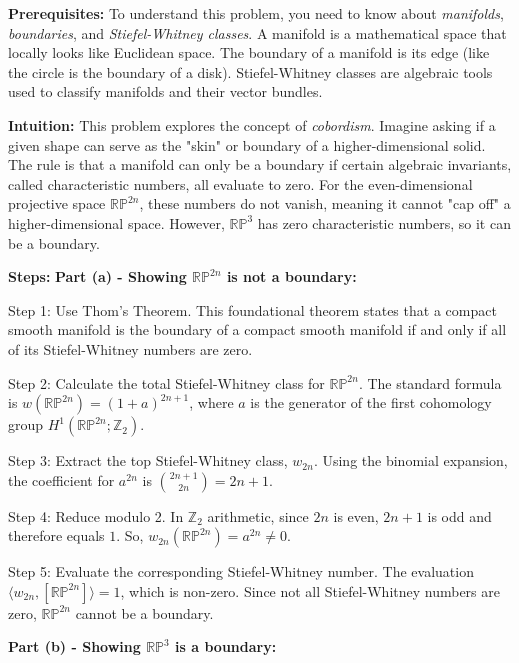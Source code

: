 \begin{solution}
\textbf{Prerequisites:}
To understand this problem, you need to know about \textit{manifolds}, \textit{boundaries}, and \textit{Stiefel-Whitney classes}. A manifold is a mathematical space that locally looks like Euclidean space. The boundary of a manifold is its edge (like the circle is the boundary of a disk). Stiefel-Whitney classes are algebraic tools used to classify manifolds and their vector bundles.

\vspace{\baselineskip}
\textbf{Intuition:}
This problem explores the concept of \textit{cobordism}. Imagine asking if a given shape can serve as the "skin" or boundary of a higher-dimensional solid. The rule is that a manifold can only be a boundary if certain algebraic invariants, called characteristic numbers, all evaluate to zero. For the even-dimensional projective space $\mathbb{RP}^{2n}$, these numbers do not vanish, meaning it cannot "cap off" a higher-dimensional space. However, $\mathbb{RP}^3$ has zero characteristic numbers, so it can be a boundary.

\vspace{\baselineskip}
\textbf{Steps:}
\textbf{Part (a) - Showing $\mathbb{RP}^{2n}$ is not a boundary:}

Step 1: Use Thom's Theorem. This foundational theorem states that a compact smooth manifold is the boundary of a compact smooth manifold if and only if all of its Stiefel-Whitney numbers are zero.

Step 2: Calculate the total Stiefel-Whitney class for $\mathbb{RP}^{2n}$. The standard formula is $w(\mathbb{RP}^{2n}) = (1+a)^{2n+1}$, where $a$ is the generator of the first cohomology group $H^1(\mathbb{RP}^{2n}; \mathbb{Z}_2)$.

Step 3: Extract the top Stiefel-Whitney class, $w_{2n}$. Using the binomial expansion, the coefficient for $a^{2n}$ is $\binom{2n+1}{2n} = 2n+1$.

Step 4: Reduce modulo 2. In $\mathbb{Z}_2$ arithmetic, since $2n$ is even, $2n+1$ is odd and therefore equals $1$. So, $w_{2n}(\mathbb{RP}^{2n}) = a^{2n} \neq 0$.

Step 5: Evaluate the corresponding Stiefel-Whitney number. The evaluation $\langle w_{2n}, [\mathbb{RP}^{2n}] \rangle = 1$, which is non-zero. Since not all Stiefel-Whitney numbers are zero, $\mathbb{RP}^{2n}$ cannot be a boundary.

\vspace{\baselineskip}
\textbf{Part (b) - Showing $\mathbb{RP}^{3}$ is a boundary:}


\end{solution}
